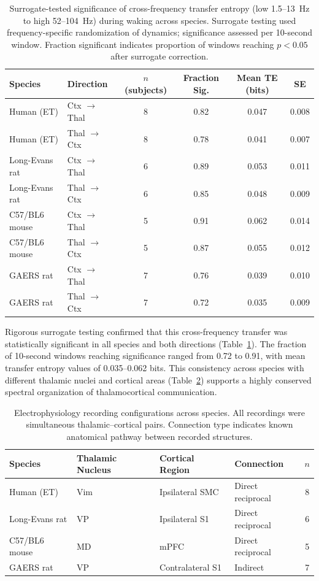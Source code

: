 \documentclass[11pt]{article}
\begin{document}
\begin{table}[H]
\centering
\caption{Surrogate-tested significance of cross-frequency transfer entropy (low 1.5--13~Hz to high 52--104~Hz) during waking across species. Surrogate testing used frequency-specific randomization of dynamics; significance assessed per 10-second window. Fraction significant indicates proportion of windows reaching $p < 0.05$ after surrogate correction.}
\label{tab:surrogate}
\begin{tabular}{llcccc}
\toprule
Species & Direction & $n$ (subjects) & Fraction Sig. & Mean TE (bits) & SE \\
\midrule
Human (ET) & Ctx $\to$ Thal & 8 & 0.82 & 0.047 & 0.008 \\
Human (ET) & Thal $\to$ Ctx & 8 & 0.78 & 0.041 & 0.007 \\
Long-Evans rat & Ctx $\to$ Thal & 6 & 0.89 & 0.053 & 0.011 \\
Long-Evans rat & Thal $\to$ Ctx & 6 & 0.85 & 0.048 & 0.009 \\
C57/BL6 mouse & Ctx $\to$ Thal & 5 & 0.91 & 0.062 & 0.014 \\
C57/BL6 mouse & Thal $\to$ Ctx & 5 & 0.87 & 0.055 & 0.012 \\
GAERS rat & Ctx $\to$ Thal & 7 & 0.76 & 0.039 & 0.010 \\
GAERS rat & Thal $\to$ Ctx & 7 & 0.72 & 0.035 & 0.009 \\
\bottomrule
\end{tabular}
\end{table}

Rigorous surrogate testing confirmed that this cross-frequency transfer was statistically significant in all species and both directions (Table~\ref{tab:surrogate}). The fraction of 10-second windows reaching significance ranged from 0.72 to 0.91, with mean transfer entropy values of 0.035--0.062 bits. This consistency across species with different thalamic nuclei and cortical areas (Table~\ref{tab:recording}) supports a highly conserved spectral organization of thalamocortical communication.

\begin{table}[H]
\centering
\caption{Electrophysiology recording configurations across species. All recordings were simultaneous thalamic--cortical pairs. Connection type indicates known anatomical pathway between recorded structures.}
\label{tab:recording}
\begin{tabular}{llllc}
\toprule
Species & Thalamic Nucleus & Cortical Region & Connection & $n$ \\
\midrule
Human (ET) & Vim & Ipsilateral SMC & Direct reciprocal & 8 \\
Long-Evans rat & VP & Ipsilateral S1 & Direct reciprocal & 6 \\
C57/BL6 mouse & MD & mPFC & Direct reciprocal & 5 \\
GAERS rat & VP & Contralateral S1 & Indirect & 7 \\
\bottomrule
\end{tabular}
\end{table}
\end{document}
